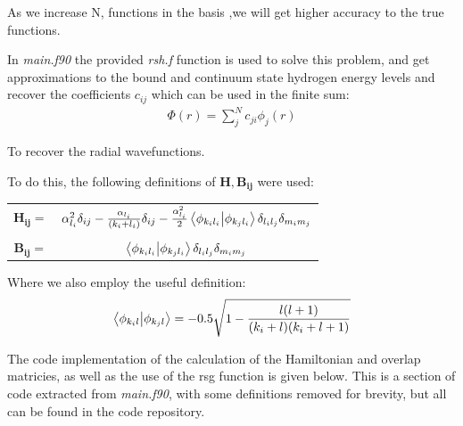 \documentclass{article}
\renewcommand{\vec}[1]{\mathbf{#1}}
\begin{document}
	As we increase N, functions in the basis ,we will get higher accuracy to the true functions. 
	
	In \textit{main.f90} the provided \textit{rsh.f} function is used to solve this problem, and get approximations to the bound and continuum state hydrogen energy levels and recover the coefficients $c_{ij}$ which can be used in the finite sum:
	\large
	\begin{gather}
		\Phi(r) = \sum_{j}^{N} c_{ji} \phi_j(r)
	\end{gather}
 	\normalsize
 	
 	To recover the radial wavefunctions.
 	
 	To do this, the following definitions of $\vec{H}, \vec{B_{ij}}$ were used:
 	
	\large
	\begin{center}
		\begin{tabular}{cc}
		$\vec{H_{ij}} =$ 	& $ \alpha_{l_i}^2\delta_{ij}    - \frac{\alpha_{l_i}}{(k_i + l_i)}\delta_{ij} -  \frac{\alpha_{l_i}^2}{2}\braket{\phi_{k_il_i}}{\phi_{k_jl_i}} \delta_{l_il_j} \delta_{m_im_j}$ \\
		& \\
		$\vec{B_{ij}} =$	& $\braket{\phi_{k_il_i}}{\phi_{k_jl_i}} \delta_{l_il_j} \delta_{m_im_j}$\\
		\end{tabular}
	\end{center}
	\normalsize
	
	Where we also employ the useful definition:
	\large
	\begin{gather}
		\braket{\phi_{k_il}}{\phi_{k_jl}} = -0.5\sqrt{1-\frac{l(l+1)}{(k_i+l)(k_i+l+1)}}
	\end{gather}
	\normalsize
	
	The code implementation of the calculation of the Hamiltonian and overlap matricies, as well as the use of the rsg function is given below. This is a section of code extracted from \textit{main.f90}, with some definitions removed for brevity, but all can be found in the code repository. 
	
\end{document}
